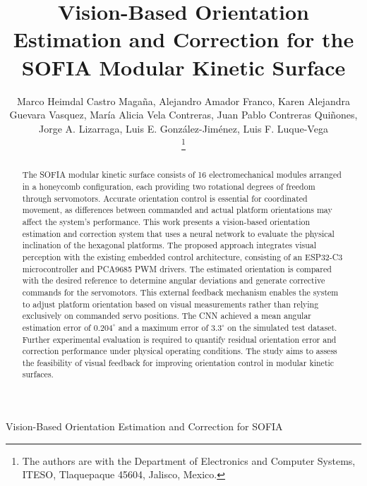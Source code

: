 \documentclass[lettersize,journal]{IEEEtran}
\begin{document}
	\title{Vision-Based Orientation Estimation and Correction for the
	SOFIA Modular Kinetic Surface}
	
	\author{
		Marco Heimdal Castro Magaña, Alejandro Amador Franco, Karen Alejandra Guevara Vasquez, María Alicia Vela Contreras, Juan Pablo Contreras Quiñones,
		Jorge A. Lizarraga, Luis E. González-Jiménez, Luis F. Luque-Vega
		
		\thanks{The authors are with the Department
			of Electronics and Computer Systems,
			ITESO, Tlaquepaque 45604, Jalisco, Mexico.}
	}
	
	
	{Vision-Based Orientation Estimation and Correction for SOFIA}
	
	\maketitle
	
	
	
\begin{abstract}
    The SOFIA modular kinetic surface consists of 16 electromechanical modules arranged in a honeycomb configuration, each providing two rotational degrees of freedom through servomotors. 
	Accurate orientation control is essential for coordinated movement, as differences between commanded and actual platform orientations may affect the system's performance. This work presents a vision-based orientation 
	estimation and correction system that uses a neural network to evaluate the physical inclination of the hexagonal platforms. The proposed approach integrates visual perception with the existing embedded control architecture, 
	consisting of an ESP32-C3 microcontroller and PCA9685 PWM drivers. The estimated orientation is compared with the desired reference to determine angular deviations and generate corrective commands for the servomotors. 
	This external feedback mechanism enables the system to adjust platform orientation based on visual measurements rather than relying exclusively on commanded servo positions. The CNN achieved a mean angular estimation error of $0.204^\circ$ and a maximum error of $3.3^\circ$ on the simulated test dataset.
	Further experimental evaluation is required to quantify residual orientation error and correction performance under physical operating conditions. The study aims to assess the feasibility of visual feedback for improving orientation control in modular kinetic surfaces.
\end{abstract}
\end{document}
